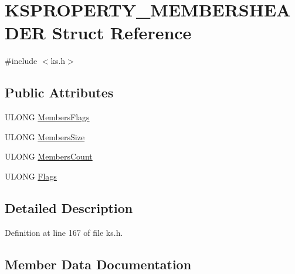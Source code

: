 \hypertarget{struct_k_s_p_r_o_p_e_r_t_y___m_e_m_b_e_r_s_h_e_a_d_e_r}{}\section{K\+S\+P\+R\+O\+P\+E\+R\+T\+Y\+\_\+\+M\+E\+M\+B\+E\+R\+S\+H\+E\+A\+D\+ER Struct Reference}
\label{struct_k_s_p_r_o_p_e_r_t_y___m_e_m_b_e_r_s_h_e_a_d_e_r}


{\ttfamily \#include $<$ks.\+h$>$}

\subsection*{Public Attributes}
\begin{DoxyCompactItemize}
\item 
U\+L\+O\+NG \hyperlink{struct_k_s_p_r_o_p_e_r_t_y___m_e_m_b_e_r_s_h_e_a_d_e_r_a7ce4c541d1e347aad8c19d241f1ef890}{Members\+Flags}
\item 
U\+L\+O\+NG \hyperlink{struct_k_s_p_r_o_p_e_r_t_y___m_e_m_b_e_r_s_h_e_a_d_e_r_ab3b54cd17776211c90863bdad4485513}{Members\+Size}
\item 
U\+L\+O\+NG \hyperlink{struct_k_s_p_r_o_p_e_r_t_y___m_e_m_b_e_r_s_h_e_a_d_e_r_a9d28d105427e281243c4819a94f8a450}{Members\+Count}
\item 
U\+L\+O\+NG \hyperlink{struct_k_s_p_r_o_p_e_r_t_y___m_e_m_b_e_r_s_h_e_a_d_e_r_a9e37e2476cef657b377d427668ebe30f}{Flags}
\end{DoxyCompactItemize}


\subsection{Detailed Description}


Definition at line 167 of file ks.\+h.



\subsection{Member Data Documentation}
